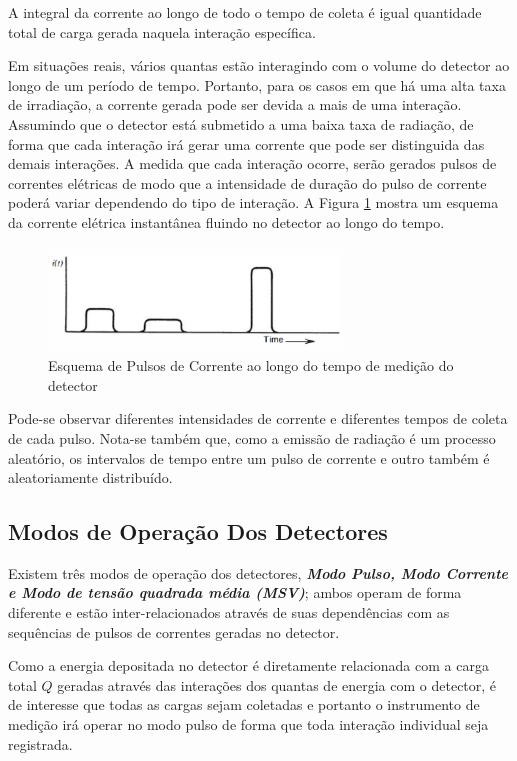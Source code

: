 \documentclass[11pt,a4paper]{article}
\begin{document}
	\noindent A integral da corrente ao longo de todo o tempo de coleta é igual quantidade total de carga gerada naquela interação específica. 

	Em situações reais, vários quantas estão interagindo com o volume do detector ao longo de um período de tempo. Portanto, para os casos em que há uma alta taxa de irradiação, a corrente gerada pode ser devida a mais de uma interação.  Assumindo que o detector está submetido a uma baixa taxa de radiação, de forma que cada interação irá gerar uma corrente que pode ser distinguida das demais interações. A medida que cada interação ocorre, serão gerados pulsos de correntes elétricas de modo que a intensidade de duração do pulso de corrente poderá variar dependendo do tipo de interação. A Figura \ref{fig:esquemaCorrentePulsada} mostra um esquema da corrente elétrica instantânea fluindo no detector ao longo do tempo.

		\begin{figure}[h]
			\centering
			\includegraphics[width=0.7\textwidth]{Imagens/esquemaCorrentePulsada.jpg}
			\caption{Esquema de Pulsos de Corrente ao longo do tempo de medição do detector}
			\label{fig:esquemaCorrentePulsada}
		\end{figure}

	\noindent Pode-se observar diferentes intensidades de corrente e diferentes tempos de coleta de cada pulso. Nota-se também que, como a emissão de radiação é um processo aleatório, os intervalos de tempo entre um pulso de corrente e outro também é aleatoriamente distribuído. 
      
	\subsection{Modos de Operação Dos Detectores}

		Existem três modos de operação dos detectores, \textcolor{CarnationPink}{\textbf{\textit{Modo Pulso, Modo Corrente e Modo de tensão quadrada média (MSV)}}}; ambos operam de forma diferente e estão inter-relacionados através de suas dependências com as sequências de pulsos de correntes geradas no detector. 

		Como a energia depositada no detector é diretamente relacionada com a carga total $Q$ geradas através das interações dos quantas de energia com o detector, é de interesse que todas as cargas sejam coletadas e portanto o instrumento de medição irá operar no \textcolor{CarnationPink}{modo pulso} de forma que toda interação individual seja registrada. 
\end{document}
